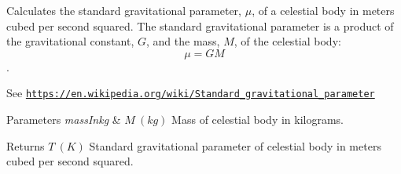 Calculates the standard gravitational parameter, $\mu$, of a celestial body in meters cubed per second squared. The standard gravitational parameter is a product of the gravitational constant, $G$, and the mass, $M$, of the celestial body\+: \[\mu = GM\]. 

See \href{https://en.wikipedia.org/wiki/Standard_gravitational_parameter}{\tt https\+://en.\+wikipedia.\+org/wiki/\+Standard\+\_\+gravitational\+\_\+parameter}


\begin{DoxyParams}{Parameters}
{\em mass\+Inkg} & $M\ (kg)$ Mass of celestial body in kilograms. \\
\hline
\end{DoxyParams}
\begin{DoxyReturn}{Returns}
$T\ (K)$ Standard gravitational parameter of celestial body in meters cubed per second squared. 
\end{DoxyReturn}
